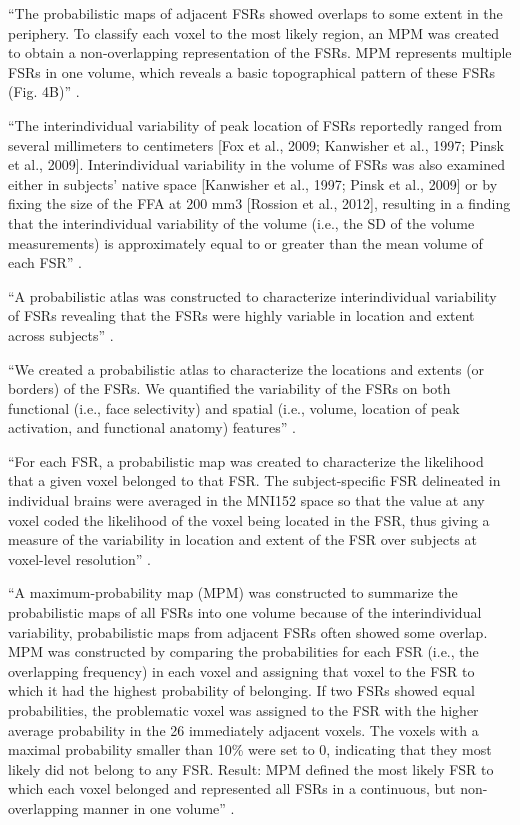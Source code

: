 ``The probabilistic maps of adjacent FSRs showed overlaps to some extent in the
periphery.
%
To classify each voxel to the most likely region, an MPM was created to obtain a
non-overlapping representation of the FSRs.
%
MPM represents multiple FSRs in one volume, which reveals a basic topographical
pattern of these FSRs (Fig. 4B)'' \citet{zhen2015quantifying}.

``The interindividual variability of peak location of FSRs reportedly ranged
from several millimeters to centimeters [Fox et al., 2009; Kanwisher et al.,
1997; Pinsk et al., 2009].
%
Interindividual variability in the volume of FSRs was also examined either in
subjects' native space [Kanwisher et al., 1997; Pinsk et al., 2009] or by fixing
the size of the FFA at 200 mm3 [Rossion et al., 2012], resulting in a finding
that the interindividual variability of the volume (i.e., the SD of the volume
measurements) is approximately equal to or greater than the mean volume of each
FSR'' \citet{zhen2015quantifying}.



``A probabilistic atlas was constructed to characterize interindividual
variability of FSRs revealing that the FSRs were highly variable in location and
extent across subjects'' \citep{zhen2015quantifying}.

``We created a probabilistic atlas to characterize the locations and extents (or
borders) of the FSRs.
%
We quantified the variability of the FSRs on both functional (i.e., face
selectivity) and spatial (i.e., volume, location of peak activation, and
functional anatomy) features'' \citep{zhen2015quantifying}.

``For each FSR, a probabilistic map was created to characterize the likelihood
that a given voxel belonged to that FSR.
%
The subject-specific FSR delineated in individual brains were averaged in the
MNI152 space so that the value at any voxel coded the likelihood of the voxel
being located in the FSR, thus giving a measure of the variability in location
and extent of the FSR over subjects at voxel-level resolution''
\citep{zhen2015quantifying}.

``A maximum-probability map (MPM) was constructed to summarize the probabilistic
maps of all FSRs into one volume because of the interindividual variability,
probabilistic maps from adjacent FSRs often showed some overlap.
%
MPM was constructed by comparing the probabilities for each FSR (i.e., the
overlapping frequency) in each voxel and assigning that voxel to the FSR to
which it had the highest probability of belonging.
%
If two FSRs showed equal probabilities, the problematic voxel was assigned to
the FSR with the higher average probability in the 26 immediately adjacent
voxels.
%
The voxels with a maximal probability smaller than 10\% were set to 0,
indicating that they most likely did not belong to any FSR.
%
Result: MPM defined the most likely FSR to which each voxel belonged and
represented all FSRs in a continuous, but non-overlapping manner in one
volume'' \citep{zhen2015quantifying}.



